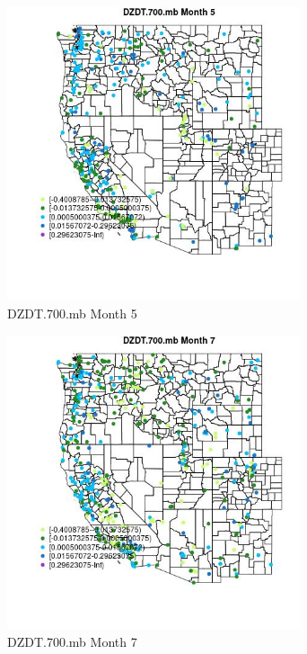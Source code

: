 \begin{figure} 
\centering  
\includegraphics[width=0.77\textwidth]{Code_Outputs/Report_ML_input_PM25_Step4_part_e_de_duplicated_aves_compiled_2019-05-18wNAs_MapObsMo5DZDT700mb.jpg} 
\caption{\label{fig:Report_ML_input_PM25_Step4_part_e_de_duplicated_aves_compiled_2019-05-18wNAsMapObsMo5DZDT700mb}DZDT.700.mb Month 5} 
\end{figure} 
 

\begin{figure} 
\centering  
\includegraphics[width=0.77\textwidth]{Code_Outputs/Report_ML_input_PM25_Step4_part_e_de_duplicated_aves_compiled_2019-05-18wNAs_MapObsMo7DZDT700mb.jpg} 
\caption{\label{fig:Report_ML_input_PM25_Step4_part_e_de_duplicated_aves_compiled_2019-05-18wNAsMapObsMo7DZDT700mb}DZDT.700.mb Month 7} 
\end{figure} 
 


